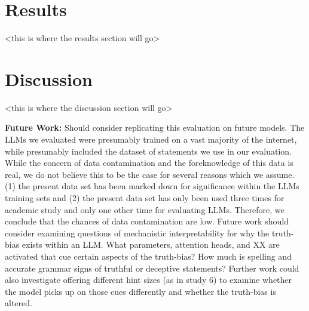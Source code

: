 \documentclass{article}
\begin{document}






\section{Results}

<this is where the results section will go>

\section{Discussion}

<this is where the discussion section will go>

\textbf{Future Work:} Should consider replicating this evaluation on future models. The LLMs we evaluated were presumably trained on a vast majority of the internet, while presumably included the dataset of statements we use in our evaluation. While the concern of data contamination and the foreknowledge of this data is real, we do not believe this to be the case for several reasons which we assume. (1) the present data set has been marked down for significance within the LLMs training sets and (2) the present data set has only been used three times for academic study and only one other time for evaluating LLMs. Therefore, we conclude that the chances of data contamination are low. Future work should consider examining questions of mechanistic interpretability for why the truth-bias exists within an LLM. What parameters, attention heads, and XX are activated that cue certain aspects of the truth-bias? How much is spelling and accurate grammar signs of truthful or deceptive statements? Further work could also investigate offering different hint sizes (as in study 6) to examine whether the model picks up on those cues differently and whether the truth-bias is altered. 
\end{document}
